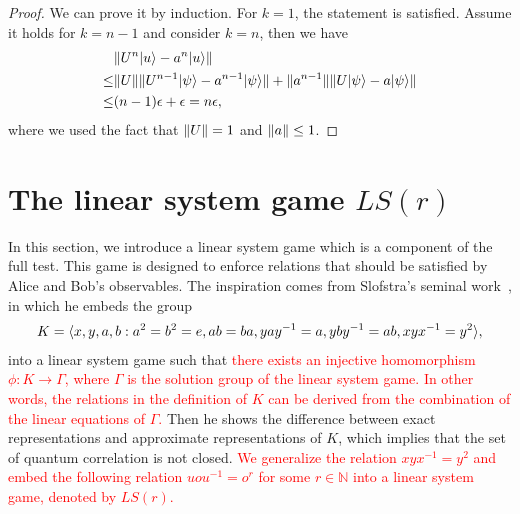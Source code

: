 \documentclass[11pt,letterpaper]{article}
\newcommand{\ket}[1]{|#1\rangle}
\DeclarePairedDelimiter{\norm}{\lVert}{\rVert}
\DeclarePairedDelimiter{\ip}{\langle}{\rangle}
\newcommand{\N}{\mathbb{N}}
\newcommand{\1}{\mathbb{1}}
\newcommand{\LS}{LS}
\newcommand{\ep}{\epsilon}
\newcommand{\hf}[1]{\textcolor{red}{#1}}
\theoremstyle{definition}
\begin{document}
\begin{proof}
	We can prove it by induction. 
	For $k=1$, the statement is satisfied.
	Assume it holds for $k = n-1$ and consider $k = n$, then we have
	\begin{align*}
		&\norm{U^n \ket{u} - a^n\ket{u}} \\
		\leq &\norm{U} \norm{U^{n-1} \ket{\psi} - a^{n-1}\ket{\psi}} + \norm{a^{n-1}}
		\norm{U\ket{\psi} - a \ket{\psi}}\\
		\leq &(n-1)\ep + \ep = n \ep,
	\end{align*}
	where we used the fact that $\norm{U} = 1$ and $\norm{a} \leq 1$.
\end{proof}

\section{The linear system game $\LS(r)$}
\label{sec:lsg}
In this section, we introduce a linear system game which is a component of the full test.
This game is designed to enforce relations that should be satisfied by 
Alice and Bob's observables. The inspiration comes from 
Slofstra's seminal work~\cite{slofstra2017}, in which he
embeds the group
\begin{align}
	K = \ip{ x,y,a,b:a^2=b^2=e, ab=ba, yay^{-1} = a, yby^{-1} = ab, xyx^{-1}=y^2},
\end{align}
into a linear system game such that 
\hf{there exists an injective homomorphism $\phi: K \rightarrow \Gamma$, where $\Gamma$ is
the solution group of the linear system game.}
\hf{In other words, the relations in the definition of $K$ can be derived from the
combination of the linear equations of $\Gamma$.} Then he shows the difference between exact representations
and approximate representations of $K$, which implies that the set of quantum correlation is not closed.
\hf{We generalize the relation $xyx^{-1} = y^2$ and embed the 
following relation
$
uou^{-1} = o^r 
$
for some $r \in \N$ into a linear system game, denoted by $\LS(r)$.}

\end{document}
